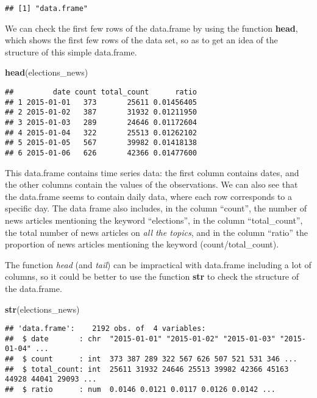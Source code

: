 \documentclass[
]{article}
\newenvironment{Shaded}{\begin{snugshade}}{\end{snugshade}}
\newcommand{\FunctionTok}[1]{\textcolor[rgb]{0.13,0.29,0.53}{\textbf{#1}}}
\newcommand{\NormalTok}[1]{#1}
\begin{document}
\begin{verbatim}
## [1] "data.frame"
\end{verbatim}

We can check the first few rows of the data.frame by using the function \textbf{head}, which shows the first few rows of the data set, so as to get an idea of the structure of this simple data.frame.

\begin{Shaded}
\begin{Highlighting}[]
\FunctionTok{head}\NormalTok{(elections\_news)}
\end{Highlighting}
\end{Shaded}

\begin{verbatim}
##         date count total_count      ratio
## 1 2015-01-01   373       25611 0.01456405
## 2 2015-01-02   387       31932 0.01211950
## 3 2015-01-03   289       24646 0.01172604
## 4 2015-01-04   322       25513 0.01262102
## 5 2015-01-05   567       39982 0.01418138
## 6 2015-01-06   626       42366 0.01477600
\end{verbatim}

This data.frame contains time series data: the first column contains dates, and the other columns contain the values of the observations. We can also see that the data.frame seems to contain daily data, where each row corresponds to a specific day. The data frame also includes, in the column ``count'', the number of news articles mentioning the keyword ``elections'', in the column ``total\_count'', the total number of news articles on \emph{all the topics}, and in the column ``ratio'' the proportion of news articles mentioning the keyword (count/total\_count).

The function \emph{head} (and \emph{tail}) can be impractical with data.frame including a lot of columns, so it could be better to use the function \textbf{str} to check the structure of the data.frame.

\begin{Shaded}
\begin{Highlighting}[]
\FunctionTok{str}\NormalTok{(elections\_news)}
\end{Highlighting}
\end{Shaded}

\begin{verbatim}
## 'data.frame':    2192 obs. of  4 variables:
##  $ date       : chr  "2015-01-01" "2015-01-02" "2015-01-03" "2015-01-04" ...
##  $ count      : int  373 387 289 322 567 626 507 521 531 346 ...
##  $ total_count: int  25611 31932 24646 25513 39982 42366 45163 44928 44041 29093 ...
##  $ ratio      : num  0.0146 0.0121 0.0117 0.0126 0.0142 ...
\end{verbatim}
\end{document}

